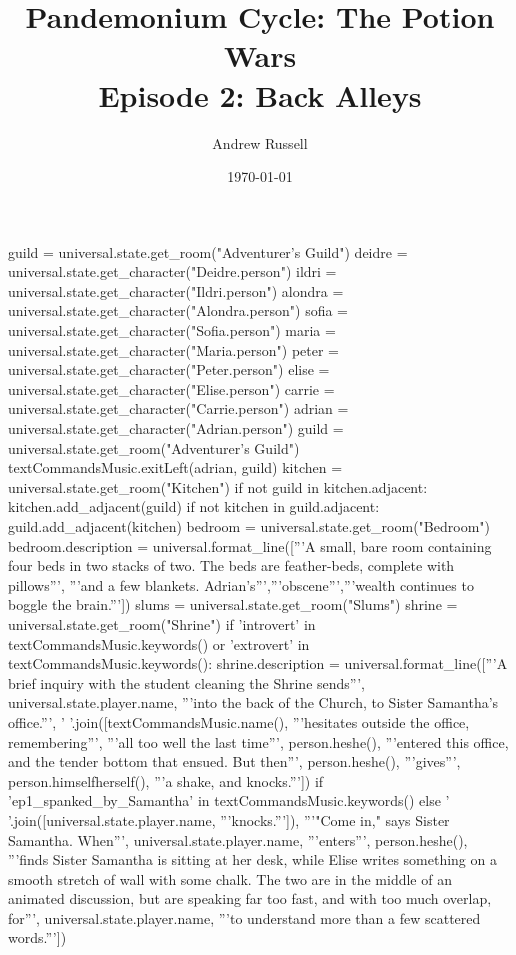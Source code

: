 \documentclass{book}
\title{Pandemonium Cycle: The Potion Wars \\ Episode 2: Back Alleys}
\author{Andrew Russell}
\date{\today}
\begin{document}
\maketitle

\begin{openScene}
    guild = universal.state.get_room("Adventurer's Guild")
    deidre = universal.state.get_character("Deidre.person")
    ildri = universal.state.get_character("Ildri.person")
    alondra = universal.state.get_character("Alondra.person")
    sofia = universal.state.get_character("Sofia.person")
    maria = universal.state.get_character("Maria.person")
    peter = universal.state.get_character("Peter.person")
    elise = universal.state.get_character("Elise.person")
    carrie = universal.state.get_character("Carrie.person")
    adrian = universal.state.get_character("Adrian.person")
    guild = universal.state.get_room("Adventurer's Guild")
    textCommandsMusic.exitLeft(adrian, guild)
    kitchen = universal.state.get_room("Kitchen")
    if not guild in kitchen.adjacent:
        kitchen.add_adjacent(guild)
    if not kitchen in guild.adjacent:
        guild.add_adjacent(kitchen)
    bedroom = universal.state.get_room("Bedroom")
    bedroom.description = universal.format_line(['''A small, bare room containing four beds in two stacks of two. The beds are feather-beds, complete with pillows''',
        '''and a few blankets. Adrian's''','''obscene''','''wealth continues to boggle the brain.''']) 
    slums = universal.state.get_room("Slums")
    shrine = universal.state.get_room("Shrine")
    if 'introvert' in textCommandsMusic.keywords() or 'extrovert' in textCommandsMusic.keywords():
        shrine.description = universal.format_line(['''A brief inquiry with the student cleaning the Shrine sends''', universal.state.player.name, '''into the back of the Church, to Sister Samantha's office.''', ' '.join([textCommandsMusic.name(), '''hesitates outside the office, remembering''',
            '''all too well the last time''', person.heshe(), '''entered this office, and the tender bottom that ensued. But then''', person.heshe(), '''gives''', person.himselfherself(), '''a shake, and knocks.''']) 
            if 'ep1_spanked_by_Samantha' in textCommandsMusic.keywords() else
        ' '.join([universal.state.player.name, '''knocks.''']), '''"Come in," says Sister Samantha. When''', universal.state.player.name, '''enters''', person.heshe(), '''finds Sister Samantha is sitting at her desk, while Elise writes something on a smooth stretch of wall with some chalk. The two are in the middle of an animated discussion, but are speaking far too fast, and with too much overlap, for''', universal.state.player.name, '''to understand more than a few scattered words.'''])

\end{openScene}
\end{document}
